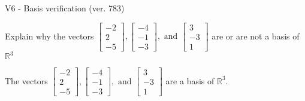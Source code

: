 \begin{exercise}
  \begin{exerciseTitle}V6 - Basis verification (ver. 783)\end{exerciseTitle}
  \begin{exerciseStatement}
    Explain why the vectors \(\left[\begin{array}{r}
-2 \\
2 \\
-5
\end{array}\right] , \left[\begin{array}{r}
-4 \\
-1 \\
-3
\end{array}\right] , \text{ and } \left[\begin{array}{r}
3 \\
-3 \\
1
\end{array}\right]\) are or are not a basis of \(\mathbb{R}^3\)	


  \end{exerciseStatement}
  \begin{exerciseAnswer}
   The vectors \(\left[\begin{array}{r}
-2 \\
2 \\
-5
\end{array}\right] , \left[\begin{array}{r}
-4 \\
-1 \\
-3
\end{array}\right] , \text{ and } \left[\begin{array}{r}
3 \\
-3 \\
1
\end{array}\right]\) 
  	 are  a basis of \(\mathbb{R}^3\).
  


  \end{exerciseAnswer}
\end{exercise}